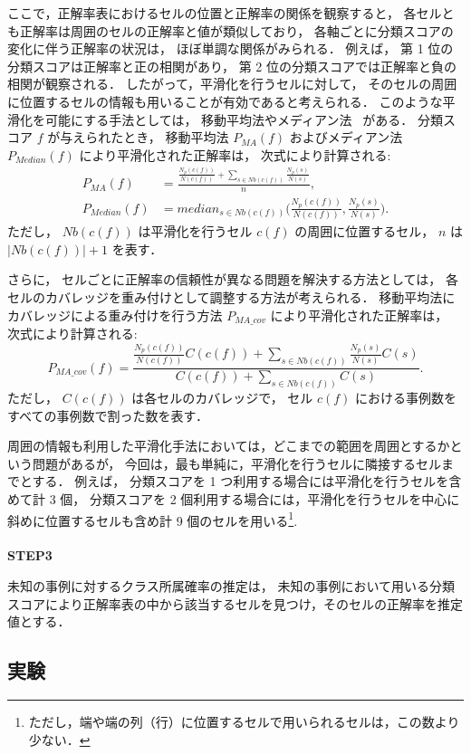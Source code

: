 \documentclass[japanese]{jnlp_1.4}
\begin{document}
ここで，正解率表におけるセルの位置と正解率の関係を観察すると，
各セルとも正解率は周囲のセルの正解率と値が類似しており，
各軸ごとに分類スコアの変化に伴う正解率の状況は，
ほぼ単調な関係がみられる．
例えば，
第 1 位の分類スコアは正解率と正の相関があり，
第 2 位の分類スコアでは正解率と負の相関が観察される．
したがって，平滑化を行うセルに対して，
そのセルの周囲に位置するセルの情報も用いることが有効であると考えられる．
このような平滑化を可能にする手法としては，
移動平均法やメディアン法~\cite{Agui91_j} がある．
分類スコア $f$ が与えられたとき，
移動平均法 $P_{MA}(f)$ およびメディアン法 $P_{Median}(f)$ により平滑化された正解率は，
次式により計算される:
\begin{align}
 P_{\mathit{MA}}(f) & = \frac{\frac{N_p(c(f))}{N(c(f))} + \sum_{s\in Nb(c(f))}
	 \frac{N_p(s)}{N(s)}}{n},\\
 P_{\mathit{Median}}(f) & = \mathit{median}_{s\in Nb(c(f))} \Bigg( \frac{N_p(c(f))}{N(c(f))} , 
	\frac{N_p(s)}{N(s)} \Biggr).
\end{align}
ただし，
$Nb(c(f))$ は平滑化を行うセル $c(f)$ の周囲に位置するセル，
$n$ は $|Nb(c(f))|+1$ を表す．

さらに，
セルごとに正解率の信頼性が異なる問題を解決する方法としては，
各セルのカバレッジを重み付けとして調整する方法が考えられる．
移動平均法にカバレッジによる重み付けを行う方法 $P_{MA\_cov}$ により平滑化された正解率は，
次式により計算される: 
\begin{equation}
P_{\mathit{MA}\_cov}(f)=\frac{\frac{N_p(c(f))}{N(c(f))}C(c(f))
 + \sum_{s\in Nb(c(f))} \frac{N_p(s)}{N(s)}C(s)}{C(c(f))+\sum_{s\in Nb(c(f))}C(s)}.
\end{equation}
ただし，
 $C(c(f))$ は各セルのカバレッジで，
セル $c(f)$ における事例数をすべての事例数で割った数を表す．

周囲の情報も利用した平滑化手法においては，どこまでの範囲を周囲とするかという問題があるが，
今回は，最も単純に，平滑化を行うセルに隣接するセルまでとする．
例えば，
分類スコアを 1 つ利用する場合には平滑化を行うセルを含めて計 3 個，
分類スコアを 2 個利用する場合には，平滑化を行うセルを中心に斜めに位置するセルも含め計 9 個のセルを用いる\footnote{
	ただし，端や端の列（行）に位置するセルで用いられるセルは，この数より少ない．
}. \\\\ 
{\bf STEP3}
 
未知の事例に対するクラス所属確率の推定は，
未知の事例において用いる分類スコアにより正解率表の中から該当するセルを見つけ，そのセルの正解率を推定値とする．

\subsection{実験}
\end{document}
